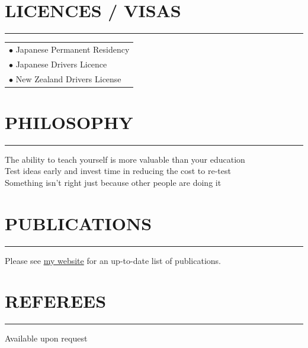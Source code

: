 \documentclass[english]{extarticle}
\newcommand{\mySect}[2]{
    \section*{\textcolor{secondary}{#1}\hfill{\footnotesize\textmd{{#2}}}}
    \vspace{-2em}
    \textcolor{tertiary}{\hrule}
    \vspace{0.5em}
}
\begin{document}
\vspace{1.0cm}

\mySect{LICENCES / VISAS}{}
\begin{tabular}{l}
$\bullet$ Japanese Permanent Residency \\
$\bullet$ Japanese Drivers Licence \\
$\bullet$ New Zealand Drivers License \\
\end{tabular}

\vspace{1.0cm}

\mySect{PHILOSOPHY}{}
\begin{centering}
\onehalfspacing
\noindent
The ability to teach yourself is more valuable than your education\\
\noindent
Test ideas early and invest time in reducing the cost to re-test\\
\noindent
Something isn't right just because other people are doing it\\
\end{centering}

\vspace{1.0cm}

\mySect{PUBLICATIONS}{}
\noindent
Please see \href{https://markhedleyjones.com/about}{my website} for an up-to-date list of publications.

\vspace{1.0cm}

\mySect{REFEREES}{}
\noindent
Available upon request
\end{document}
